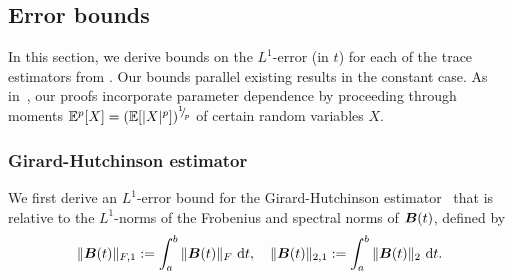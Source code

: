 

\subsection{Error bounds}

In this section, we derive bounds on the $L^1$-error (in $t$) for each of the trace estimators from . Our bounds parallel existing results in the constant case. As in~\cite{kressner-2024-randomized-lowrank}, our proofs incorporate parameter dependence by proceeding through moments $\mathbb{E}^p[X] = (\mathbb{E}[|X|^p])^{{}^{1}{\mskip -5mu/\mskip -3mu}_{p}}$ of certain random variables $X$.

\subsubsection{Girard-Hutchinson estimator}
\label{subsec:hutchinson}

We first derive an $L^1$-error bound for the Girard-Hutchinson estimator~ that is relative to the $L^1$-norms of the Frobenius and spectral norms of $\boldsymbol{B}(t)$, defined by
\[
 \|\boldsymbol{B}(t)\|_{F,1} := \int_{a}^{b} \|\boldsymbol{B}(t)\|_{F}~\mathrm{d}t, \quad  \|\boldsymbol{B}(t)\|_{2,1} := \int_{a}^{b} \|\boldsymbol{B}(t)\|_{2}~\mathrm{d}t.
\]



